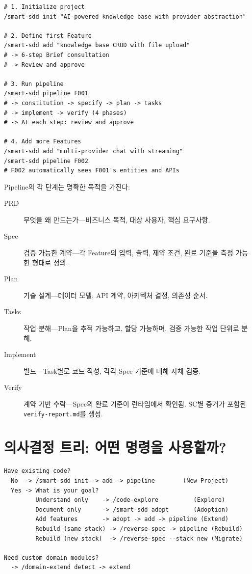\documentclass[11pt,a4paper,openright,twoside]{report}
\newcommand{\file}[1]{\texttt{#1}}
\begin{document}
\begin{lstlisting}[title={From Idea to Working App}]
# 1. Initialize project
/smart-sdd init "AI-powered knowledge base with provider abstraction"

# 2. Define first Feature
/smart-sdd add "knowledge base CRUD with file upload"
# -> 6-step Brief consultation
# -> Review and approve

# 3. Run pipeline
/smart-sdd pipeline F001
# -> constitution -> specify -> plan -> tasks
# -> implement -> verify (4 phases)
# -> At each step: review and approve

# 4. Add more Features
/smart-sdd add "multi-provider chat with streaming"
/smart-sdd pipeline F002
# F002 automatically sees F001's entities and APIs
\end{lstlisting}

Pipeline의 각 단계는 명확한 목적을 가진다:

\begin{description}
  \item[PRD] 무엇을 왜 만드는가---비즈니스 목적, 대상 사용자, 핵심 요구사항.
  \item[Spec] 검증 가능한 계약---각 Feature의 입력, 출력, 제약 조건, 완료 기준을 측정 가능한 형태로 정의.
  \item[Plan] 기술 설계---데이터 모델, API 계약, 아키텍처 결정, 의존성 순서.
  \item[Tasks] 작업 분해---Plan을 추적 가능하고, 할당 가능하며, 검증 가능한 작업 단위로 분해.
  \item[Implement] 빌드---Task별로 코드 작성, 각각 Spec 기준에 대해 자체 검증.
  \item[Verify] 계약 기반 수락---Spec의 완료 기준이 런타임에서 확인됨. SC별 증거가 포함된 \file{verify-report.md}를 생성.
\end{description}

\section{의사결정 트리: 어떤 명령을 사용할까?}

\begin{lstlisting}[title={Command Selection Decision Tree}]
Have existing code?
  No  -> /smart-sdd init -> add -> pipeline        (New Project)
  Yes -> What is your goal?
         Understand only    -> /code-explore          (Explore)
         Document only      -> /smart-sdd adopt       (Adoption)
         Add features       -> adopt -> add -> pipeline (Extend)
         Rebuild (same stack) -> /reverse-spec -> pipeline (Rebuild)
         Rebuild (new stack)  -> /reverse-spec --stack new (Migrate)

Need custom domain modules?
  -> /domain-extend detect -> extend
\end{lstlisting}
\end{document}
